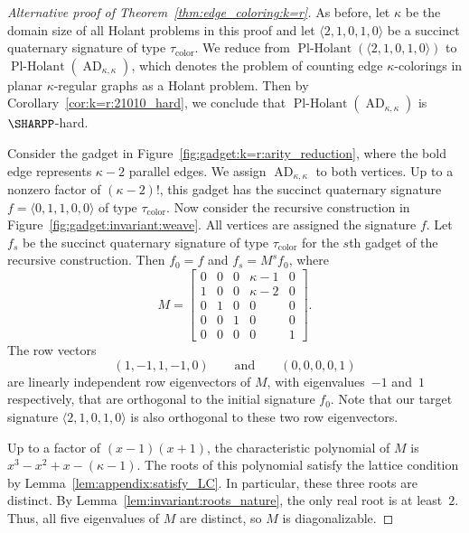 \documentclass[11pt]{article}
\newcommand{\PlHolant}{\operatorname{Pl-Holant}}
\newcommand{\AD}{\operatorname{AD}}
\begin{document}
\begin{proof}[Alternative proof of Theorem~\ref{thm:edge_coloring:k=r}]
 As before,
 let $\kappa$ be the domain size of all Holant problems in this proof
 and let $\langle 2,1,0,1,0 \rangle$ be a succinct quaternary signature of type $\tau_\text{color}$.
 We reduce from $\PlHolant(\langle 2,1,0,1,0 \rangle)$ to $\PlHolant(\AD_{\kappa,\kappa})$,
 which denotes the problem of counting edge $\kappa$-colorings in planar $\kappa$-regular graphs as a Holant problem.
 Then by Corollary~\ref{cor:k=r:21010_hard},
 we conclude that $\PlHolant(\AD_{\kappa,\kappa})$ is $\SHARPP$-hard.

 Consider the gadget in Figure~\ref{fig:gadget:k=r:arity_reduction},
 where the bold edge represents $\kappa - 2$ parallel edges.
 We assign $\AD_{\kappa,\kappa}$ to both vertices.
 Up to a nonzero factor of $(\kappa-2)!$,
 this gadget has the succinct quaternary signature $f = \langle 0,1,1,0,0 \rangle$ of type $\tau_\text{color}$.
 Now consider the recursive construction in Figure~\ref{fig:gadget:invariant:weave}.
 All vertices are assigned the signature $f$.
 Let $f_s$ be the succinct quaternary signature of type $\tau_\text{color}$ for the $s$th gadget of the recursive construction.
 Then $f_0 = f$ and $f_s = M^s f_0$,
 where
 \[
  M =
  \begin{bmatrix}
   0 & 0 & 0 & \kappa - 1 & 0 \\
   1 & 0 & 0 & \kappa - 2 & 0 \\
   0 & 1 & 0 &          0 & 0 \\
   0 & 0 & 1 &          0 & 0 \\
   0 & 0 & 0 &          0 & 1
  \end{bmatrix}.
 \]
 The row vectors
 \[
  (1, -1, 1, -1, 0) 
  \qquad \text{and} \qquad
  (0,  0, 0,  0, 1)
 \]
 are linearly independent row eigenvectors of $M$,
 with eigenvalues~$-1$ and~$1$ respectively,
 that are orthogonal to the initial signature $f_0$.
 Note that our target signature $\langle 2,1,0,1,0 \rangle$ is also orthogonal to these two row eigenvectors.
 
 Up to a factor of $(x - 1) (x + 1)$,
 the characteristic polynomial of $M$ is $x^3 - x^2 + x - (\kappa - 1)$.
 The roots of this polynomial satisfy the lattice condition by Lemma~\ref{lem:appendix:satisfy_LC}.
 In particular,
 these three roots are distinct.
 By Lemma~\ref{lem:invariant:roots_nature},
 the only real root is at least~$2$.
 Thus, all five eigenvalues of $M$ are distinct,
 so $M$ is diagonalizable.
 

\end{proof}
\end{document}
